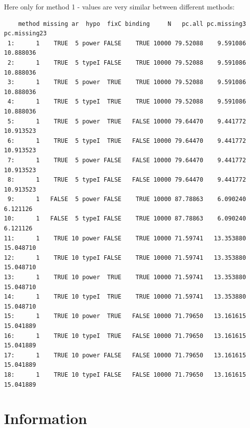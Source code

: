 \documentclass[12pt]{article}
\begin{document}
Here only for method 1 - values are very similar between different
methods:
\begin{verbatim}
    method missing ar  hypo  fixC binding     N   pc.all pc.missing3 pc.missing23
 1:      1    TRUE  5 power FALSE    TRUE 10000 79.52088    9.591086    10.888036
 2:      1    TRUE  5 typeI FALSE    TRUE 10000 79.52088    9.591086    10.888036
 3:      1    TRUE  5 power  TRUE    TRUE 10000 79.52088    9.591086    10.888036
 4:      1    TRUE  5 typeI  TRUE    TRUE 10000 79.52088    9.591086    10.888036
 5:      1    TRUE  5 power  TRUE   FALSE 10000 79.64470    9.441772    10.913523
 6:      1    TRUE  5 typeI  TRUE   FALSE 10000 79.64470    9.441772    10.913523
 7:      1    TRUE  5 power FALSE   FALSE 10000 79.64470    9.441772    10.913523
 8:      1    TRUE  5 typeI FALSE   FALSE 10000 79.64470    9.441772    10.913523
 9:      1   FALSE  5 power FALSE    TRUE 10000 87.78863    6.090240     6.121126
10:      1   FALSE  5 typeI FALSE    TRUE 10000 87.78863    6.090240     6.121126
11:      1    TRUE 10 power FALSE    TRUE 10000 71.59741   13.353880    15.048710
12:      1    TRUE 10 typeI FALSE    TRUE 10000 71.59741   13.353880    15.048710
13:      1    TRUE 10 power  TRUE    TRUE 10000 71.59741   13.353880    15.048710
14:      1    TRUE 10 typeI  TRUE    TRUE 10000 71.59741   13.353880    15.048710
15:      1    TRUE 10 power  TRUE   FALSE 10000 71.79650   13.161615    15.041889
16:      1    TRUE 10 typeI  TRUE   FALSE 10000 71.79650   13.161615    15.041889
17:      1    TRUE 10 power FALSE   FALSE 10000 71.79650   13.161615    15.041889
18:      1    TRUE 10 typeI FALSE   FALSE 10000 71.79650   13.161615    15.041889
\end{verbatim}

\clearpage

\section{Information}
\label{sec:org4fa0543}
\end{document}
